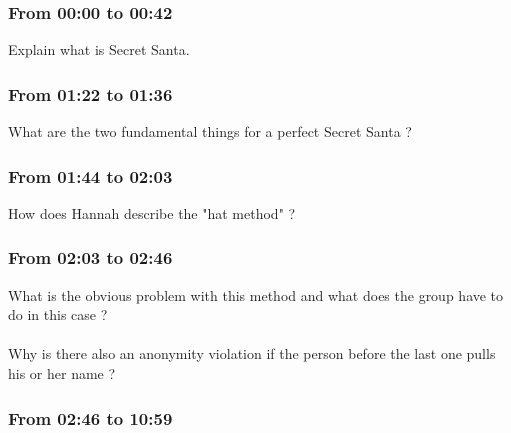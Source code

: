 \documentclass[12pt,a4paper,eval,english,firamath]{nsi}
\begin{document}
\maketitle
\subsubsection*{From 00:00 to 00:42}
Explain what is Secret Santa.\\


\subsubsection*{From 01:22 to 01:36}
What are the two fundamental things for a perfect Secret Santa ?\\

\subsubsection*{From 01:44 to 02:03}
How does Hannah describe the "hat method" ?\\


\subsubsection*{From 02:03 to 02:46}
What is the obvious problem with this method and what does the group have to do in this case ?\\

\\

Why is there also an anonymity violation if the person before the last one pulls his or her name ?\\

\subsubsection*{From 02:46 to 10:59}
\end{document}
